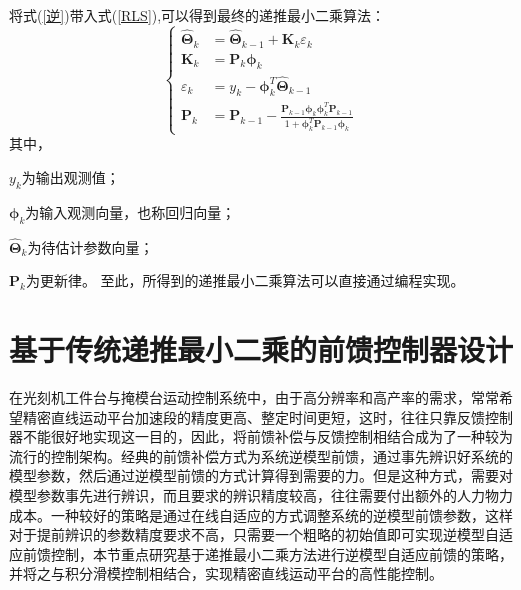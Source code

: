 将式(\ref{逆})带入式(\ref{RLS}),可以得到最终的递推最小二乘算法：
\begin{equation}
\label{RLS1}
\left\{
\begin{aligned}
\hat{\symbf{\Theta}}_{k}&=\hat{\symbf{\Theta}}_{k-1}+\symbf{K}_{k} \varepsilon_{k}\\
\symbf{K}_{k}&=\symbf{P}_{k} \symbf{\phi}_{k}\\
\varepsilon_{k}&={y_{k}}-{\symbf{\phi}_{k}^{T}\hat{\symbf{\Theta}}_{k-1}}\\
\symbf{P}_{k}&=\symbf{P}_{k-1}-\frac{\symbf{P}_{k-1} \symbf{\phi}_{k} \symbf{\phi}_{k}^{T} \symbf{P}_{k-1}}{1+\symbf{\phi}_{k}^{T} \symbf{P}_{k-1} \symbf{\phi}_{k}}
\end{aligned}
\right.
\end{equation}
其中，

$y_k$为输出观测值；

$\symbf{\phi}_k$为输入观测向量，也称回归向量；

$\hat{\symbf{\Theta}}_{k}$为待估计参数向量；

$\symbf{P}_k$为更新律。
至此，所得到的递推最小二乘算法可以直接通过编程实现。


\section{基于传统递推最小二乘的前馈控制器设计}
在光刻机工件台与掩模台运动控制系统中，由于高分辨率和高产率的需求，常常希望精密直线运动平台加速段的精度更高、整定时间更短，这时，往往只靠反馈控制器不能很好地实现这一目的，因此，将前馈补偿与反馈控制相结合成为了一种较为流行的控制架构。经典的前馈补偿方式为系统逆模型前馈，通过事先辨识好系统的模型参数，然后通过逆模型前馈的方式计算得到需要的力。但是这种方式，需要对模型参数事先进行辨识，而且要求的辨识精度较高，往往需要付出额外的人力物力成本。一种较好的策略是通过在线自适应的方式调整系统的逆模型前馈参数\cite{butler2012adaptive}，这样对于提前辨识的参数精度要求不高，只需要一个粗略的初始值即可实现逆模型自适应前馈控制，本节重点研究基于递推最小二乘方法进行逆模型自适应前馈的策略，并将之与积分滑模控制相结合，实现精密直线运动平台的高性能控制。

